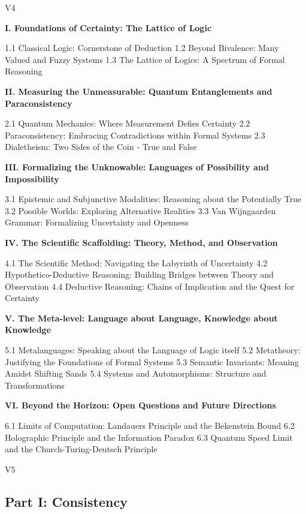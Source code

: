 V4

\textbf{I. Foundations of Certainty: The Lattice of Logic}

1.1 Classical Logic: Cornerstone of Deduction 1.2 Beyond Bivalence: Many
Valued and Fuzzy Systems 1.3 The Lattice of Logics: A Spectrum of Formal
Reasoning

\textbf{II. Measuring the Unmeasurable: Quantum Entanglements and
Paraconsistency}

2.1 Quantum Mechanics: Where Measurement Defies Certainty 2.2
Paraconsistency: Embracing Contradictions within Formal Systems 2.3
Dialetheism: Two Sides of the Coin - True and False

\textbf{III. Formalizing the Unknowable: Languages of Possibility and
Impossibility}

3.1 Epistemic and Subjunctive Modalities: Reasoning about the
Potentially True 3.2 Possible Worlds: Exploring Alternative Realities
3.3 Van Wijngaarden Grammar: Formalizing Uncertainty and Openness

\textbf{IV. The Scientific Scaffolding: Theory, Method, and Observation}

4.1 The Scientific Method: Navigating the Labyrinth of Uncertainty 4.2
Hypothetico-Deductive Reasoning: Building Bridges between Theory and
Observation 4.4 Deductive Reasoning: Chains of Implication and the Quest
for Certainty

\textbf{V. The Meta-level: Language about Language, Knowledge about
Knowledge}

5.1 Metalanguages: Speaking about the Language of Logic itself 5.2
Metatheory: Justifying the Foundations of Formal Systems 5.3 Semantic
Invariants: Meaning Amidst Shifting Sands 5.4 Systems and Automorphisms:
Structure and Transformations

\textbf{VI. Beyond the Horizon: Open Questions and Future Directions}

6.1 Limits of Computation: Landauer\textquotesingle s Principle and the
Bekenstein Bound 6.2 Holographic Principle and the Information Paradox
6.3 Quantum Speed Limit and the Church-Turing-Deutsch Principle

V5

\hypertarget{part-i-consistency}{%
\subsection*{\texorpdfstring{Part I: Consistency
}{Part I: Consistency }}\label{part-i-consistency}}

